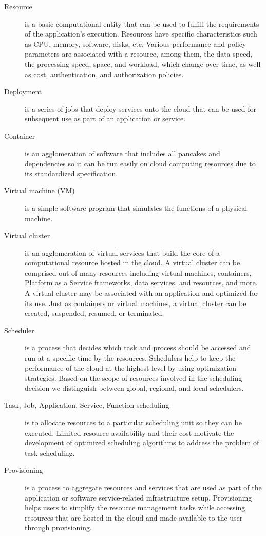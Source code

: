 \documentclass[final,5p,times,twocolumn]{elsarticle}
\begin{document}
\begin{description}

\item[Resource] is a basic computational entity that can be used to fulfill the requirements of the application's execution. Resources have specific characteristics such as CPU, memory, software, disks, etc. Various performance and policy parameters are associated with a resource, among them, the data speed, the processing speed, space, and workload, which change over time, as well as cost, authentication, and authorization policies.

\item[Deployment] is a series of jobs that deploy services onto the cloud that can be used for subsequent use as part of an application or service.

\item[Container] is an agglomeration of software that includes all pancakes and dependencies so it can be run easily on cloud computing resources due to its standardized specification.

\item[Virtual machine (VM)] is a simple software program that simulates the functions of a physical machine.

\item[Virtual cluster] is an agglomeration of virtual services that build the core of a computational resource hosted in the cloud. A virtual cluster can be comprised out of many resources including virtual machines, containers, Platform as a Service frameworks, data services, and resources, and more. A virtual cluster may be associated with an application and optimized for its use. Just as containers or virtual machines, a virtual cluster can be created, suspended, resumed, or terminated. 

\item[Scheduler] is a process that decides which task and process should be accessed and run at a specific time by the resources. Schedulers help to keep the performance of the cloud at the highest level by using optimization strategies. Based on the scope of resources involved in the scheduling decision we distinguish between global, regional, and local schedulers.
 
\item[Task, Job, Application, Service, Function scheduling] is to allocate resources to a particular scheduling unit so they can be executed. Limited resource availability and their cost motivate the development of optimized scheduling algorithms to address the problem of task scheduling.
 
\item[Provisioning] is a process to aggregate resources and services that are used as part of the application or software service-related infrastructure setup. Provisioning helps users to simplify the resource management tasks while accessing resources that are hosted in the cloud and made available to the user through provisioning. 

\end{description}
\end{document}
